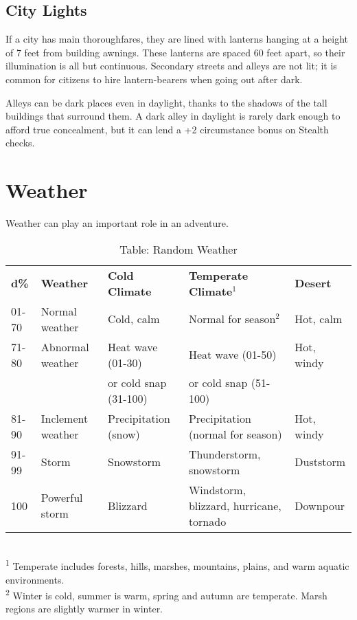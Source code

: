 \subsection{City Lights}

				
If a city has main thoroughfares, they are lined with lanterns hanging at a height of 7 feet from building awnings. These lanterns are spaced 60 feet apart, so their illumination is all but continuous. Secondary streets and alleys are not lit; it is common for citizens to hire lantern-bearers when going out after dark.
				
Alleys can be dark places even in daylight, thanks to the shadows of the tall buildings that surround them. A dark alley in daylight is rarely dark enough to afford true concealment, but it can lend a +2 circumstance bonus on Stealth checks.
				
\section{Weather}

				
Weather can play an important role in an adventure.
				
\begin{table*}[]
\sffamily
\caption{Table: Random Weather}
\begin{tabular}{lllll}
\textbf{d\%} & \textbf{Weather} & \textbf{Cold Climate} & \textbf{Temperate Climate\(^{1}\)} & \textbf{Desert}\\
01-70 & Normal weather & Cold, calm & Normal for season\(^{2}\) & Hot, calm\\
71-80 & Abnormal weather & Heat wave (01-30) & Heat wave (01-50)  & Hot, windy\\
      &                  & or cold snap (31-100) & or cold snap (51-100) & \\
81-90 & Inclement weather & Precipitation (snow) & Precipitation (normal for season) & Hot, windy\\
91-99 & Storm & Snowstorm & Thunderstorm, snowstorm & Duststorm\\
100 & Powerful storm & Blizzard & Windstorm, blizzard, hurricane, tornado & Downpour\\
\end{tabular}\\
\textsuperscript{1} Temperate includes forests, hills, marshes, mountains, plains, and warm aquatic environments.\\
\textsuperscript{2} Winter is cold, summer is warm, spring and autumn are temperate. Marsh regions are slightly warmer in winter.\\
\end{table*}
				
